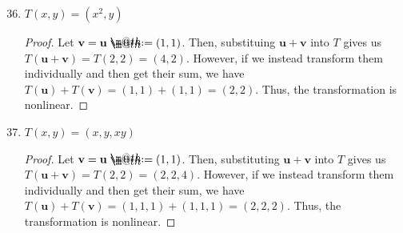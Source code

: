 \documentclass{article}
\makeatletter
\newcommand*{\defeq}{\mathrel{\rlap{%
                     \raisebox{0.3ex}{$\m@th\cdot$}}%
                     \raisebox{-0.3ex}{$\m@th\cdot$}}%
                     =}
\makeatother
\begin{document}
\begin{enumerate}
    \setcounter{enumi}{35}
    \item \(T(x,y) = (x^2,y)\)\begin{proof}
        Let \(\mathbf{v} = \mathbf{u} \defeq (1,1)\). Then, substituing \(\mathbf{u} + \mathbf{v}\) into \(T\) gives us \(T(\mathbf{u} + \mathbf{v}) = T(2,2) = (4,2)\). However, if 
        we instead transform them individually and then get their sum, we have \(T(\mathbf{u}) + T(\mathbf{v}) = (1,1) + (1,1) = (2,2)\). Thus, 
        the transformation is nonlinear. 
    \end{proof}
    \item \(T(x,y) = (x,y,xy)\)\begin{proof}
        Let \(\mathbf{v} = \mathbf{u} \defeq (1,1)\). Then, substituting \(\mathbf{u} + \mathbf{v}\) into \(T\) gives us \(T(\mathbf{u} + \mathbf{v}) = T(2,2) = (2,2,4)\). However, if 
        we instead transform them individually and then get their sum, we have \(T(\mathbf{u}) + T(\mathbf{v}) = (1,1,1) + (1,1,1) = (2,2,2)\). Thus, 
        the transformation is nonlinear. 
    \end{proof}
\end{enumerate}
\pagebreak 
\end{document}
